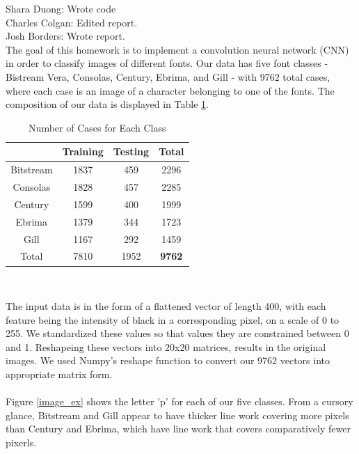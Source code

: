 \documentclass{homework}
\begin{document}
\maketitle

Shara Duong: Wrote code\\
Charles Colgan: Edited report. \\
Josh Borders: Wrote report. \\

The goal of this homework is to implement a convolution neural network (CNN) in order to classify images of different fonts. Our data has five font classes - Bistream Vera, Consolas, Century, Ebrima, and Gill - with 9762 total cases, where each case is an image of a character belonging to one of the fonts. The composition of our data is displayed in Table \ref{case_comp}.

\begin{table}[h]
    \centering
    {\begin{tabular}{c|cc|c}
         &Training&Testing&Total\\
         \hline
         Bitstream&1837&459&2296\\
         Consolas&1828&457&2285\\
         Century&1599&400&1999\\
         Ebrima&1379&344&1723\\
         Gill&1167&292&1459\\
         \hline
         Total&7810&1952&\textbf{9762}
    \end{tabular}}\\
    \caption{Number of Cases for Each Class}
    \label{case_comp}
\end{table}

The input data is in the form of a flattened vector of length 400, with each feature being the intensity of black in a corresponding pixel, on a scale of 0 to 255. We standardized these values so that values they are constrained between 0 and 1. Reshapeing these vectors into 20x20 matrices, results in the original images. We used Numpy's reshape function to convert our 9762 vectors into  appropriate matrix form.\\\\
Figure \ref{image_ex} shows the letter 'p' for each of our five classes. From a cursory glance, Bitstream and Gill appear to have thicker line work covering more pixels than Century and Ebrima, which have line work that covers comparatively fewer pixerls.
\end{document}
